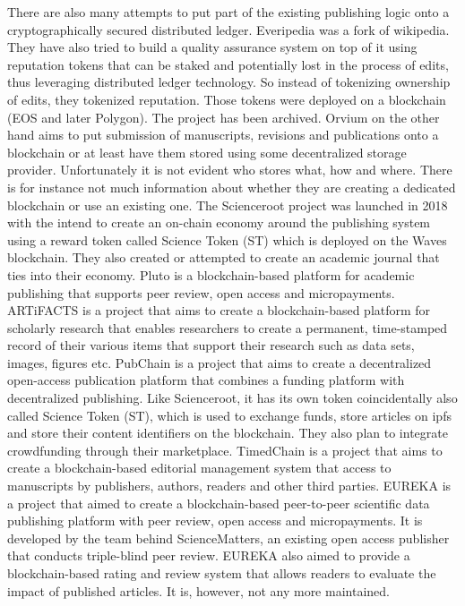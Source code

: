 There are also many attempts to put part of the existing publishing logic onto a cryptographically secured distributed ledger. Everipedia \cite{}   was a fork of wikipedia. They have also tried to build a quality assurance system on top of it using reputation tokens that can be staked and potentially lost in the process of edits, thus leveraging distributed ledger technology. So instead of tokenizing ownership of edits, they tokenized reputation. Those tokens were deployed on a blockchain (EOS and later Polygon). The project has been archived. Orvium \cite{} on the other hand aims to put submission of manuscripts, revisions and publications onto a blockchain or at least have them stored using some decentralized storage provider. Unfortunately it is not evident who stores what, how and where. There is for instance not much information about whether they are creating a dedicated blockchain or use an existing one. 
The Scienceroot project \cite{} was launched in 2018 with the intend to create an on-chain economy around the publishing system using a reward token called Science Token (ST) which is deployed on the Waves blockchain. They also created or attempted to create an academic journal that ties into their economy. Pluto \cite{} is a blockchain-based platform for academic publishing that supports peer review, open access and micropayments. ARTiFACTS \cite{} is a project that aims to create a blockchain-based platform for scholarly research that enables researchers to create a permanent, time-stamped record of their various items that support their research such as data sets, images, figures etc. 
PubChain \cite{} is a project that aims to create a decentralized open-access publication platform that combines a funding platform with decentralized publishing. Like Scienceroot, it has its own token coincidentally also called Science Token (ST), which is used to exchange funds, store articles on ipfs and store their content identifiers on the blockchain. They also plan to integrate crowdfunding through their marketplace. TimedChain \cite{} is a project that aims to create a blockchain-based editorial management system that access to manuscripts by publishers, authors, readers and other third parties. EUREKA \cite{schaufelbuhl2019eureka} is a project that aimed to create a blockchain-based peer-to-peer scientific data publishing platform with peer review, open access and micropayments. It is developed by the team behind ScienceMatters, an existing open access publisher that conducts triple-blind peer review. EUREKA also aimed to provide a blockchain-based rating and review system that allows readers to evaluate the impact of published articles. It is, however, not any more maintained. 
